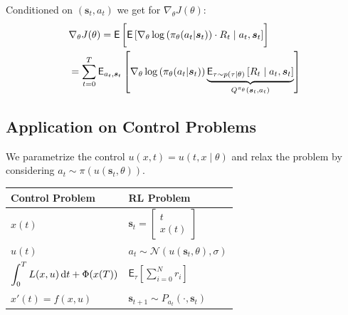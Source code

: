 \documentclass[a4paper,12pt, oneside, twocolumn]{scrartcl}
\newcommand{\rot}[2][rot]{\textcolor{#1}{#2}}
\newcommand{\dt}{\thinspace \mathrm{d}t}
\begin{document}
Conditioned on $(\bm{s}_t,a_t)$ we get for $\nabla_{\theta} J(\theta)$:
%
\begin{align*}
    &\nabla _{\theta} J(\theta)
    =
    \mathsf{E}
    \left[
        \vphantom{\int}
        \mathsf{E}
        \left[
            \nabla_{\theta} 
            \log
            \left( 
                \pi_{\theta}(a_t|\bm{s}_t) 
            \right)
            \cdot
            R_t
            \mid a_t, \bm{s}_t
        \right]
    \right]
    \\
    &=
    \sum_{t=0}^{T}
    \mathsf{E}_{a_t, \bm{s}_t}
    \left[
        \nabla_{\theta} 
        \log
        \left( 
            \pi_{\theta}(a_t|\bm{s}_t) 
        \right)
        \underbrace{
            \mathsf{E}_{\tau \sim p(\tau|\theta)}
            \left[
                R_t \mid a_t, \bm{s}_t
            \right]
            }_{
                Q^{\pi_{\theta}}(\bm{s}_t, a_t)
            }
    \right]
\end{align*}





\subsection*{Application on Control Problems}

We parametrize the control $u(x,t) = u(t,x \mid \theta)$ and 
relax the problem by considering 
$a_t \sim \pi(u(\bm{s}_t, \theta))$. 

\begin{tabular}{ l| l}
    Control Problem   & RL Problem \\
    \hline 
    $x(t)$                
    & 
    $\bm{s}_t = 
    \begin{bmatrix}
        t \\
        x(t)
    \end{bmatrix}$
    \\
    $u(t)$                
    & 
    $a_t \sim \mathcal{N}(u(\bm{s}_t, \theta), \sigma)$
    \\
    $\displaystyle \int_0^T L(x,u) \dt + \Phi(x(T))$                
    & 
    $\displaystyle \mathsf{E}_{\tau}\left[ \sum_{i=0}^{N} r_i \right]$
    \\
    $\displaystyle x'(t) = f(x,u)$
    &   
    $\displaystyle \bm{s}_{t+1} \sim P_{a_t}(\cdot,\bm{s}_{t})$
\end{tabular}
\end{document}
